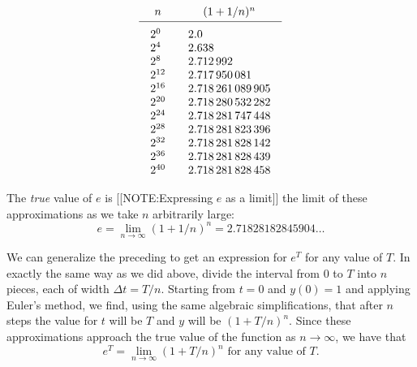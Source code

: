 	\addtolength{\arraycolsep}{12pt}
	\[
\begin{array}{cc}
	n & (1 + 1/n)^n \\[2pt] \hline
	\begin{array}{l}
	2^0 \rule{0pt}{14pt} \\ 2^4 \\ 2^8 \\ 2^{12} \\ 2^{16}
		\\ 2^{20} \\ 2^{24} \\ 2^{28} \\ 2^{32} \\ 2^{36}
		\\ 2^{40} 
	\end{array}
	&
	\begin{array}{l}
	2.0 \rule{0pt}{14pt} \\
	2.638 \\
	2.712\,992 \\
	2.717\,950\,081 \\
	2.718\,261\,089\,905 \\
	2.718\,280\,532\,282 \\
	2.718\,281\,747\,448 \\
	2.718\,281\,823\,396 \\
	2.718\,281\,828\,142 \\
	2.718\,281\,828\,439 \\
	2.718\,281\,828\,458 \\
	\end{array}
\end{array}
\]
	\addtolength{\arraycolsep}{-12pt}

	The {\em true\/} value of $e$ is 
	[[NOTE:Expressing $e$ as a limit]]
the limit of these approximations as we take $n$ arbitrarily large:
	\[
e = \lim_{n \rightarrow \infty} 
		\left( 1 + 1/n \right)^n = 2.71828182845904\ldots
\]

We can generalize the preceding to get an expression for $e^T$ for any
value of $T$.  In exactly the same way as we did above, divide the
interval from 0 to $T$ into $n$ pieces, each of width $\Delta t =
T/n$.  Starting from $t=0$ and $y(0)=1$ and applying Euler's method,
we find, using the same algebraic simplifications, that after $n$
steps the value for $t$ will be $T$ and $y$ will be $(1+T/n)^n$.
Since these approximations approach the true value of the function as
$n \rightarrow \infty$, we have that
\[
e^T = \lim_{n \rightarrow \infty} 
	\left( 1 + T/n \right)^n \mbox{     for any value of $T$.}
\]



